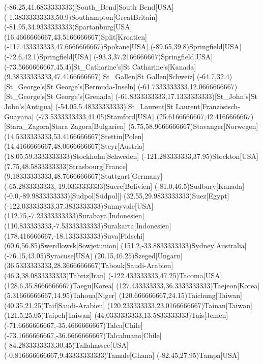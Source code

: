 \mapput(-86.25,41.6833333333)[South_Bend]{South Bend}[USA]
\mapput(-1.38333333333,50.9){Southampton}[GreatBritain]
\mapput(-81.95,34.9333333333){Spartanburg}[USA]
\mapput(16.4666666667,43.5166666667){Split}[Kroatien]
\mapput(-117.433333333,47.6666666667){Spokane}[USA]
\mapput(-89.65,39.8){Springfield}[USA]
\mapput(-72.6,42.1){Springfield}[USA]
\mapput(-93.3,37.2166666667){Springfield}[USA]
\mapput(-73.5666666667,45.4)[St_Catharine's]{St Catharine's}[Kanada]
\mapput(9.38333333333,47.4166666667)[St_Gallen]{St Gallen}[Schweiz]
\mapput(-64.7,32.4)[St_George's]{St George's}[Bermuda-Inseln]
\mapput(-61.7333333333,12.0666666667)[St_George's]{St George's}[Grenada]
\mapput(-61.8333333333,17.1333333333)[St_John's]{St John's}[Antigua]
\mapput(-54.05,5.48333333333)[St_Laurent]{St Laurent}[Französisch-Guayana]
\mapput(-73.5333333333,41.05){Stamford}[USA]
\mapput(25.6166666667,42.4166666667)[Stara_Zagora]{Stara Zagora}[Bulgarien]
\mapput(5.75,58.9666666667){Stavanger}[Norwegen]
\mapput(14.5333333333,53.4166666667){Stettin}[Polen]
\mapput(14.4166666667,48.0666666667){Steyr}[Austria]
\mapput(18.05,59.3333333333){Stockholm}[Schweden]
\mapput(-121.283333333,37.95){Stockton}[USA]
\mapput(7.75,48.5833333333){Strasbourg}[France]
\mapput(9.18333333333,48.7666666667){Stuttgart}[Germany]
\mapput(-65.2833333333,-19.0333333333){Sucre}[Bolivien]
\mapput(-81.0,46.5){Sudbury}[Kanada]
\mapput(-0.0,-89.9833333333)[Sudpol]{Südpol}[]
\mapput(32.55,29.9833333333){Suez}[Egypt]
\mapput(-122.033333333,37.3833333333){Sunnyvale}[USA]
\mapput(112.75,-7.23333333333){Surabaya}[Indonesien]
\mapput(110.833333333,-7.53333333333){Surakarta}[Indonesien]
\mapput(178.416666667,-18.1333333333){Suva}[Fidschi]
\mapput(60.6,56.85){Swerdlowsk}[Sowjetunion]
\mapput(151.2,-33.8833333333){Sydney}[Australia]
\mapput(-76.15,43.05){Syracuse}[USA]
\mapput(20.15,46.25){Szeged}[Ungarn]
\mapput(36.5333333333,28.3666666667){Tabouk}[Saudi-Arabien]
\mapput(46.3,38.0833333333){Tabriz}[Iran]
\mapput(-122.433333333,47.25){Tacoma}[USA]
\mapput(128.6,35.8666666667){Taegu}[Korea]
\mapput(127.433333333,36.3333333333){Taejeon}[Korea]
\mapput(5.31666666667,14.95){Tahoua}[Niger]
\mapput(120.666666667,24.15){Taichung}[Taiwan]
\mapput(40.35,21.25){Taif}[Saudi-Arabien]
\mapput(120.233333333,23.0166666667){Tainan}[Taiwan]
\mapput(121.5,25.05){Taipeh}[Taiwan]
\mapput(44.0333333333,13.5833333333){Tais}[Jemen]
\mapput(-71.6666666667,-35.4666666667){Talca}[Chile]
\mapput(-73.1666666667,-36.6666666667){Talcahuano}[Chile]
\mapput(-84.2833333333,30.45){Tallahassee}[USA]
\mapput(-0.816666666667,9.43333333333){Tamale}[Ghana]
\mapput(-82.45,27.95){Tampa}[USA]
